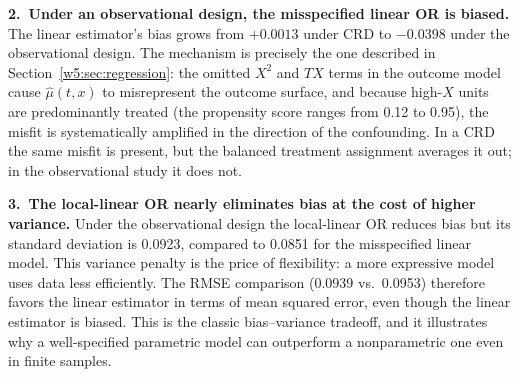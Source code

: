 \documentclass[master.tex]{subfiles}
\begin{document}
\medskip
\noindent\textbf{2.\ Under an observational design, the misspecified
linear OR is biased.}  The linear estimator's bias grows from $+0.0013$
under CRD to $-0.0398$ under the observational design.  The mechanism is precisely the one described in
Section~\ref{w5:sec:regression}: the omitted $X^2$ and $TX$ terms
in the outcome model cause $\hat\mu(t,x)$ to misrepresent the
outcome surface, and because high-$X$ units are predominantly treated
(the propensity score ranges from 0.12 to 0.95), the misfit is
systematically amplified in the direction of the confounding.  In a
CRD the same misfit is present, but the balanced treatment assignment
averages it out; in the observational study it does not.

\medskip
\noindent\textbf{3.\ The local-linear OR nearly eliminates bias at the
cost of higher variance.}  Under the observational design the
local-linear OR reduces bias  but
its standard deviation is 0.0923, compared to 0.0851 for the
misspecified linear model.  This variance penalty is the price of flexibility: a more expressive model uses data
less efficiently.  The RMSE comparison (0.0939 vs.\ 0.0953) therefore
favors the linear estimator in terms of mean squared error, even
though the linear estimator is biased.  This is the classic
bias--variance tradeoff, and it illustrates why a well-specified
parametric model can outperform a nonparametric one even in finite
samples.
\end{document}
